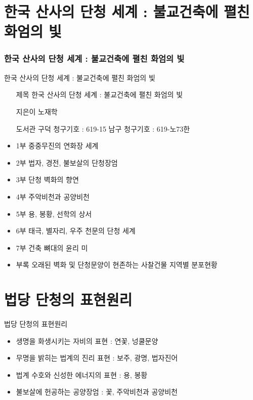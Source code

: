 \documentclass[aspectratio=1610,10pt,xcolor=pdftex,dvipsnames,table,handout]{beamer}
\begin{document}
		\section{ 한국 산사의 단청 세계 : 불교건축에 펼친 화엄의 빛 } 
		\begin{frame} [t,plain]
		\frametitle{ 한국 산사의 단청 세계 : 불교건축에 펼친 화엄의 빛 }
			\begin{block} {  한국 산사의 단청 세계 : 불교건축에 펼친 화엄의 빛 }
			\setlength{\leftmargini}{4em}			
			\begin{itemize}
				\item [제목] 한국 산사의 단청 세계 : 불교건축에 펼친 화엄의 빛 
				\item [지은이] 노재학
				\item [도서관] 
구덕 청구기호 : 619-15
남구 청구기호 : 619-노73한


				\item 1부	중중무진의 연화장 세계
				\item 2부	법자, 경전, 불보살의 단청장엄
				\item 3부	단청 벽화의 향연
				\item 4부	주악비천과 공양비천
				\item 5부	용, 봉황, 선학의 상서
				\item 6부	태극, 별자리, 우주 천문의 단청 세계
				\item 7부	건축 뼈대의 윤리 미
				\item 부록	오래된 벽화 및 단청문양이 현존하는 사찰건물 지역별 분포현황



			\end{itemize}
			\end{block}			

								
		\end{frame}						
	

		\section{ 법당 단청의 표현원리 }
		\begin{frame} [t,plain]
			\begin{block} { 법당 단청의 표현원리 }
			\setlength{\leftmargini}{6em}			
			\begin{itemize}
				\item 	생명을 화생시키는 자비의 표현 	:	연꽃, 넝쿨문양
				\item 	무명을 밝히는 법계의 진리 표현	:	보주, 광명, 법자진어
				\item 	법계 수호와 신성한 에너지의 표현	:	용, 봉황
				\item 	불보살에 헌공하는 공양장엄	:	꽃, 주악비천과 공양비천

			\end{itemize}
			\end{block}						
								
		\end{frame}						
\end{document}

